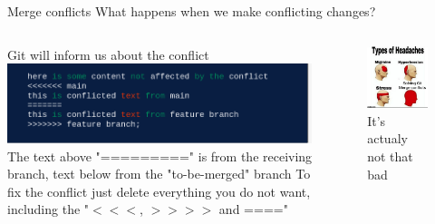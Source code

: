 \documentclass{beamer}
\begin{document}
\begin{frame}[fragile,t]{Merge conflicts}
  What happens when we make conflicting changes?
  \begin{columns}
    \begin{column}{0.5\textwidth}
      Git will inform us about the conflict\vspace{10pt}
      \includegraphics[scale=0.2]{screenshots/conflict.png}\\
      The text above "=========" is from the receiving branch, text below from the "to-be-merged" branch\vspace{10pt}
      To fix the conflict just delete everything you do not want, including the "$<<<$, $>>>>$ and ===="
    \end{column}

    \begin{column}{0.5\textwidth}
      \begin{figure}
          \centering
          \includegraphics[scale=0.2]{memes/git_merge_conflict.jpg}
          \caption{It's actualy not that bad}
      \end{figure}
    \end{column}
  \end{columns}

\end{frame}
\end{document}
